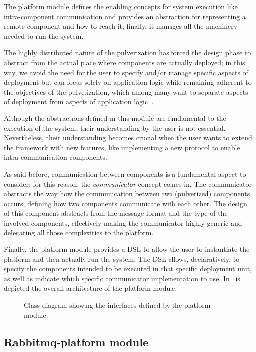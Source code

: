 The platform module defines the enabling concepts for system execution like intra-component communication and provides an abstraction for
representing a remote component and how to reach it; finally, it manages all the machinery needed to run the system.

The highly distributed nature of the pulverization has forced the design phase to abstract from the actual place where components are actually
deployed; in this way, we avoid the need for the user to specify and/or manage specific aspects of deployment but can focus solely on
application logic while remaining adherent to the objectives of the pulverization, which among many want to separate aspects of
deployment from aspects of application logic~\cite{fi12110203}.

Although the abstractions defined in this module are fundamental to the execution of the system, their understanding by the user is not essential.
Nevertheless, their understanding becomes crucial when the user wants to extend the framework with new features, like implementing a new protocol to
enable intra-communication components.

As said before, communication between components is a fundamental aspect to consider; for this reason, the \emph{communicator} concept comes in.
The communicator abstracts the way how the communication between two (pulverized) components occurs, defining how two components communicate with
each other. The design of this component abstracts from the message format and the type of the involved components, effectively making the
communicator highly generic and delegating all those complexities to the platform.

Finally, the platform module provides a DSL to allow the user to instantiate the platform and then actually run the system.
The DSL allows, declaratively, to specify the components intended to be executed in that specific deployment unit, as well as indicate which
specific communicator implementation to use. In~ is depicted the overall architecture of the platform module.

\begin{figure}
	\centering
	\caption{Class diagram showing the interfaces defined by the platform module.}
	\label{fig:platform-module-architecture}
\end{figure}

\subsection{Rabbitmq-platform module}
\label{sec:rabbitmq-platform-module}

